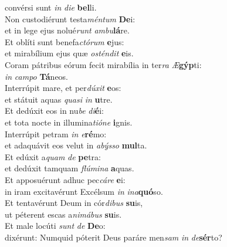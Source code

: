 \evenverse convérsi sunt \textit{in} \textit{di}\textit{e} \textbf{bel}li.\\
\oddverse Non custodiérunt testa\textit{mén}\textit{tum} \textbf{De}i:~\*\\
\oddverse et in lege ejus nolué\textit{runt} \textit{am}\textit{bu}\textbf{lá}re.\\
\evenverse Et oblíti sunt benefa\textit{ctó}\textit{rum} \textbf{e}jus:~\*\\
\evenverse et mirabílium ejus quæ \textit{o}\textit{stén}\textit{dit} \textbf{e}is.\\
\oddverse Coram pátribus eórum fecit mirabília in ter\textit{ra} \textit{Æ}\textbf{gýp}ti:~\*\\
\oddverse \textit{in} \textit{cam}\textit{po} \textbf{Tá}neos.\\
\evenverse Interrúpit mare, et per\textit{dú}\textit{xit} \textbf{e}os:~\*\\
\evenverse et státuit aquas \textit{qua}\textit{si} \textit{in} \textbf{u}tre.\\
\oddverse Et dedúxit eos in nu\textit{be} \textit{di}\textbf{é}i:~\*\\
\oddverse et tota nocte in illumina\textit{ti}\textit{ó}\textit{ne} \textbf{i}gnis.\\
\evenverse Interrúpit petram \textit{in} \textit{e}\textbf{ré}mo:~\*\\
\evenverse et adaquávit eos velut in \textit{a}\textit{býs}\textit{so} \textbf{mul}ta.\\
\oddverse Et edúxit a\textit{quam} \textit{de} \textbf{pe}tra:~\*\\
\oddverse et dedúxit tamquam \textit{flú}\textit{mi}\textit{na} \textbf{a}quas.\\
\evenverse Et apposuérunt adhuc pec\textit{cá}\textit{re} \textbf{e}i:~\*\\
\evenverse in iram excitavérunt Excélsum \textit{in} \textit{i}\textit{na}\textbf{quó}so.\\
\oddverse Et tentavérunt Deum in cór\textit{di}\textit{bus} \textbf{su}is,~\*\\
\oddverse ut péterent escas a\textit{ni}\textit{má}\textit{bus} \textbf{su}is.\\
\evenverse Et male locúti \textit{sunt} \textit{de} \textbf{De}o:~\*\\
\evenverse dixérunt: Numquid póterit Deus paráre men\textit{sam} \textit{in} \textit{de}\textbf{sér}to?\\
